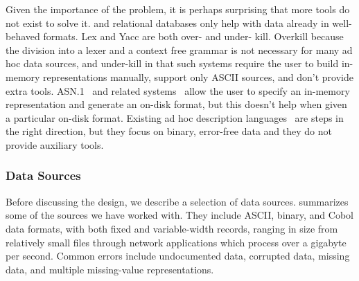 \documentclass[11pt]{article}
\begin{document}
Given the importance of the problem, it is perhaps surprising
that more tools do not exist to solve it.  \xml{} and relational databases
only help with data already in well-behaved formats.  Lex and Yacc are both
over- and under- kill.  Overkill because the division into a lexer and a context free grammar is not necessary for many ad hoc data sources, and under-kill in that such systems require the user to build in-memory representations manually,
support only ASCII sources, and don't provide extra tools.  ASN.1~\cite{asn} and related systems~\cite{asdl} allow the user to specify an in-memory representation and generate an on-disk format, but this doesn't help when given a particular on-disk format.  
Existing ad hoc description languages~\cite{gpce02,sigcomm00,erlang} are steps 
in the right direction, but they focus on binary, error-free data and they do not provide auxiliary tools.



\subsubsection{Data Sources}

Before discussing the \pads{} design, we describe a selection of data
sources.
 summarizes some of the sources we have
worked with.  They include ASCII, binary, and Cobol data formats, with
both fixed and variable-width records, ranging in size from
relatively small files through network applications which process over
a gigabyte per second.  Common errors include undocumented data,
corrupted data, missing data, and multiple missing-value
representations.
\end{document}
